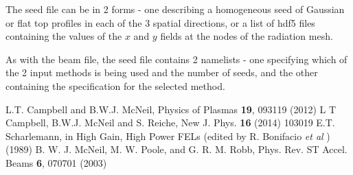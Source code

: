 \documentclass[12pt]{article}%
\begin{document}
The seed file can be in 2 forms - one describing a homogeneous seed of Gaussian or flat top profiles in each of the 3 spatial directions, or a list of hdf5 files containing the values of the $x$ and $y$ fields at the nodes of the radiation mesh.

As with the beam file, the seed file contains 2 namelists - one specifying which of the 2 input methods is being used and the number of seeds, and the other containing the specification for the selected method.



\newpage

\begin{thebibliography}{10}

L.T. Campbell and B.W.J. McNeil, Physics of Plasmas {\bf 19}, 093119 (2012)
L T Campbell, B.W.J. McNeil and S. Reiche, New J. Phys. {\bf 16} (2014) 103019
E.T. Scharlemann, in High Gain, High Power FELs (edited by R. Bonifacio \textit{et al} ) (1989)
B. W. J. McNeil, M. W. Poole, and G. R. M. Robb, Phys. Rev. ST Accel. Beams {\bf 6}, 070701 (2003)


\end{thebibliography}
\end{document}
